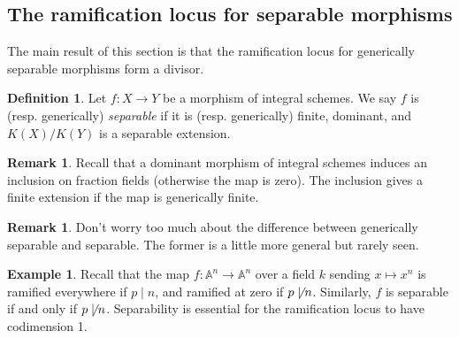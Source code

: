 \documentclass[10pt]{article}
\theoremstyle{definition}
\newtheorem{exmp}[thm]{Example}
\newtheorem{defn}[thm]{Definition}
\newtheorem{rmk}[thm]{Remark}
\begin{document}
\subsection{The ramification locus for separable morphisms}

The main result of this section is that the ramification locus for generically separable morphisms form a divisor.

\begin{defn}
Let $f: X \rightarrow Y$ be a morphism of integral schemes.  We say $f$ is (resp. generically) \emph{separable} if it is (resp. generically) finite, dominant, and $K(X)/K(Y)$ is a separable extension.
\end{defn}

\begin{rmk}
Recall that a dominant morphism of integral schemes induces an inclusion on fraction fields (otherwise the map is zero).  The inclusion gives a finite extension if the map is generically finite.
\end{rmk}


\begin{rmk}
Don't worry too much about the difference between generically separable and separable.  The former is a little more general but rarely seen.
\end{rmk}

\begin{exmp}
Recall that the map $f: \mathbb{A}^n \rightarrow \mathbb{A}^n$ over a field $k$ sending $x \mapsto x^n$ is ramified everywhere if $p \mid n$, and ramified at zero if $p \not\mid n$.  Similarly, $f$ is separable if and only if $p \not\mid n$.  Separability is essential for the ramification locus to have codimension 1.
\end{exmp}
\end{document}
